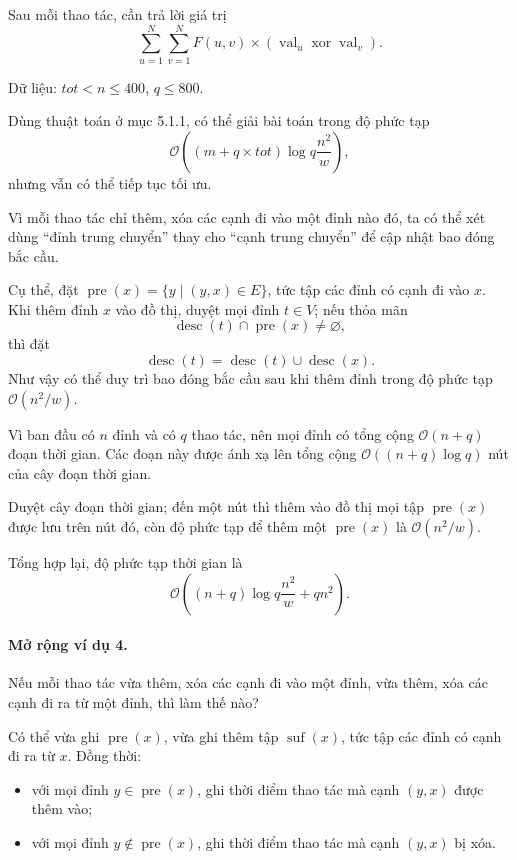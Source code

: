\documentclass[11pt]{article}
\newcommand{\Oh}{\mathcal{O}}
\begin{document}
Sau mỗi thao tác, cần trả lời giá trị
\[
  \sum_{u=1}^{N}\sum_{v=1}^{N}
  F(u,v)\times(\operatorname{val}_u\mathbin{\operatorname{xor}}\operatorname{val}_v).
\]

Dữ liệu: \(tot<n\le 400\), \(q\le 800\).

Dùng thuật toán ở mục 5.1.1, có thể giải bài toán trong độ phức tạp
\[
  \Oh\left((m+q\times tot)\log q\frac{n^2}{w}\right),
\]
nhưng vẫn có thể tiếp tục tối ưu.

Vì mỗi thao tác chỉ thêm, xóa các cạnh đi vào một đỉnh nào đó, ta có thể xét
dùng ``đỉnh trung chuyển'' thay cho ``cạnh trung chuyển'' để cập nhật bao đóng
bắc cầu.

Cụ thể, đặt \(\operatorname{pre}(x)=\{y\mid (y,x)\in E\}\), tức tập các đỉnh
có cạnh đi vào \(x\). Khi thêm đỉnh \(x\) vào đồ thị, duyệt mọi đỉnh
\(t\in V\); nếu thỏa mãn
\[
  \operatorname{desc}(t)\cap\operatorname{pre}(x)\ne\varnothing,
\]
thì đặt
\[
  \operatorname{desc}(t)=\operatorname{desc}(t)\cup\operatorname{desc}(x).
\]
Như vậy có thể duy trì bao đóng bắc cầu sau khi thêm đỉnh trong độ phức tạp
\(\Oh(n^2/w)\).

Vì ban đầu có \(n\) đỉnh và có \(q\) thao tác, nên mọi đỉnh có tổng cộng
\(\Oh(n+q)\) đoạn thời gian. Các đoạn này được ánh xạ lên tổng cộng
\(\Oh((n+q)\log q)\) nút của cây đoạn thời gian.

Duyệt cây đoạn thời gian; đến một nút thì thêm vào đồ thị mọi tập
\(\operatorname{pre}(x)\) được lưu trên nút đó, còn độ phức tạp để thêm một
\(\operatorname{pre}(x)\) là \(\Oh(n^2/w)\).

Tổng hợp lại, độ phức tạp thời gian là
\[
  \Oh\left((n+q)\log q\frac{n^2}{w}+qn^2\right).
\]

\paragraph{Mở rộng ví dụ 4.}
Nếu mỗi thao tác vừa thêm, xóa các cạnh đi vào một đỉnh, vừa thêm, xóa các
cạnh đi ra từ một đỉnh, thì làm thế nào?

Có thể vừa ghi \(\operatorname{pre}(x)\), vừa ghi thêm tập
\(\operatorname{suf}(x)\), tức tập các đỉnh có cạnh đi ra từ \(x\). Đồng thời:
\begin{itemize}
  \item với mọi đỉnh \(y\in\operatorname{pre}(x)\), ghi thời điểm thao tác mà
  cạnh \((y,x)\) được thêm vào;

  \item với mọi đỉnh \(y\notin\operatorname{pre}(x)\), ghi thời điểm thao tác
  mà cạnh \((y,x)\) bị xóa.
\end{itemize}
\end{document}
